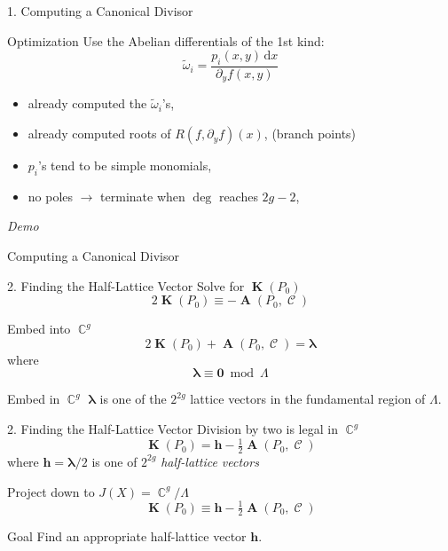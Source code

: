 \documentclass{beamer}
\DeclareMathOperator{\CC}{\mathbb{C}}
\newcommand{\dx}{\,\mathrm{d}x}
\DeclareMathOperator{\DivC}{\mathcal{C}}
\DeclareMathOperator{\RCV}{\boldsymbol{K}}
\DeclareMathOperator{\Abel}{\boldsymbol{A}}
\begin{document}
\begin{frame}{1. Computing a Canonical Divisor}{}
  \begin{block}{Optimization}
  Use the Abelian differentials of the 1st kind:
  \[
  \tilde{\omega}_i = \frac{p_i(x,y) \dx}{\partial_y f(x,y)}
  \]
  \end{block}

  \begin{itemize}[<+->]
  \item already computed the $\tilde{\omega}_i$'s,
  \item already computed roots of $R(f,\partial_y f)(x)$, (branch points)
  \item $p_i$'s tend to be simple monomials,
  \item no poles $\to$ terminate when $\deg$ reaches $2g-2$,
  \end{itemize}
\end{frame}


\begin{frame}
  \vspace{32pt}
  \begin{center}
    {\Huge \it Demo}

    \vspace{24pt}

    Computing a Canonical Divisor
  \end{center}
\end{frame}


\begin{frame}{2. Finding the Half-Lattice Vector}{}
  Solve for $\RCV(P_0)$
  \[
  2\RCV(P_0) \equiv - \Abel(P_0,\DivC)
  \]

  \pause

  Embed into $\CC^g$
  \[
  2\RCV(P_0) + \Abel(P_0,\DivC) = \boldsymbol{\lambda}
  \]
  where
  \[
  \boldsymbol{\lambda} \equiv \boldsymbol{0} \bmod{\Lambda}
  \]
  \begin{block}{Embed in $\CC^g$}
    $\boldsymbol{\lambda}$ is one of the $2^{2g}$ lattice vectors in the
    fundamental region of $\Lambda$.
  \end{block}
\end{frame}


\begin{frame}{2. Finding the Half-Lattice Vector}{}
  Division by two is legal in $\CC^g$
  \[
  \RCV(P_0) = \boldsymbol{h} - \tfrac{1}{2}\Abel(P_0,\DivC)
  \]
  where $\boldsymbol{h} = \boldsymbol{\lambda}/2$ is one of $2^{2g}$ {\it
    half-lattice vectors}

  \pause

  \vspace{12pt}

  Project down to $J(X) = \CC^g / \Lambda$
  \[
  \RCV(P_0) \equiv \boldsymbol{h} - \tfrac{1}{2}\Abel(P_0,\DivC)
  \]

  \pause

  \begin{block}{Goal}
    Find an appropriate half-lattice vector $\boldsymbol{h}$.
  \end{block}
\end{frame}
\end{document}
